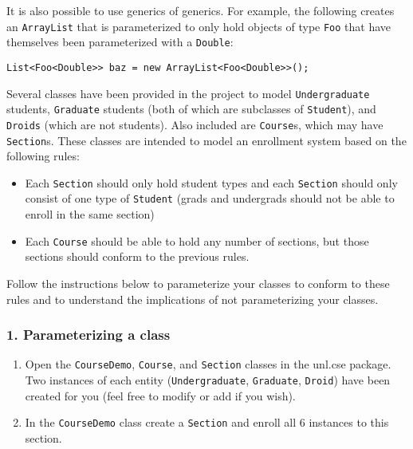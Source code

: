 \documentclass[12pt]{scrartcl}
\begin{document}
It is also possible to use generics of generics.  For example, the 
following creates an \texttt{ArrayList} that is 
parameterized to only hold objects of type \texttt{Foo} 
that have themselves been parameterized with a \texttt{Double}:

\texttt{List<Foo<Double>> baz = new ArrayList<Foo<Double>>();}

Several classes have been provided in the project to model 
\texttt{Undergraduate} students, \texttt{Graduate} 
students (both of which are subclasses of \texttt{Student}), 
and \texttt{Droids} (which are not students).  Also 
included are \texttt{Course}s, which may have \texttt{Section}s.  These classes are intended to model an enrollment 
system based on the following rules:
\begin{itemize}
  \item Each \texttt{Section} should only hold student 
    types and each \texttt{Section} should only consist 
    of one type of \texttt{Student} (grads and undergrads 
    should not be able to enroll in the same section)
  \item Each \texttt{Course} should be able to hold any 
    number of sections, but those sections should conform to the 
    previous rules.
\end{itemize}

Follow the instructions below to parameterize your classes to conform 
to these rules and to understand the implications of not parameterizing 
your classes.

\subsubsection*{1. Parameterizing a class}

\begin{enumerate}
  \item Open the \texttt{CourseDemo}, \texttt{Course}, 
    and \texttt{Section} classes in the unl.cse package.  
    Two instances of each entity (\texttt{Undergraduate}, 
    \texttt{Graduate}, \texttt{Droid}) have been 
    created for you (feel free to modify or add if you wish).
  \item In the \texttt{CourseDemo} class create a 
    \texttt{Section} and enroll all 6 instances to this 
    section.
\end{enumerate}
    
\end{document}

